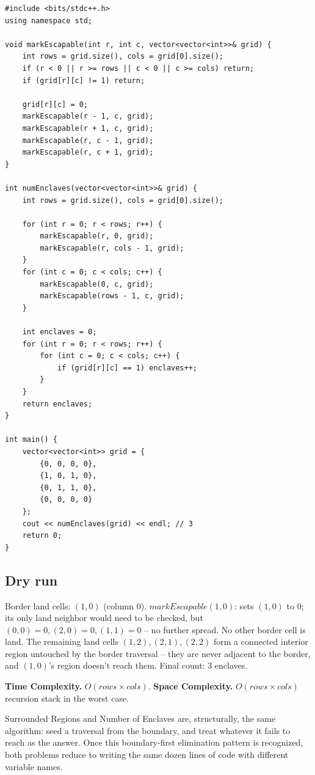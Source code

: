 \begin{lstlisting}
#include <bits/stdc++.h>
using namespace std;

void markEscapable(int r, int c, vector<vector<int>>& grid) {
    int rows = grid.size(), cols = grid[0].size();
    if (r < 0 || r >= rows || c < 0 || c >= cols) return;
    if (grid[r][c] != 1) return;

    grid[r][c] = 0;
    markEscapable(r - 1, c, grid);
    markEscapable(r + 1, c, grid);
    markEscapable(r, c - 1, grid);
    markEscapable(r, c + 1, grid);
}

int numEnclaves(vector<vector<int>>& grid) {
    int rows = grid.size(), cols = grid[0].size();

    for (int r = 0; r < rows; r++) {
        markEscapable(r, 0, grid);
        markEscapable(r, cols - 1, grid);
    }
    for (int c = 0; c < cols; c++) {
        markEscapable(0, c, grid);
        markEscapable(rows - 1, c, grid);
    }

    int enclaves = 0;
    for (int r = 0; r < rows; r++) {
        for (int c = 0; c < cols; c++) {
            if (grid[r][c] == 1) enclaves++;
        }
    }
    return enclaves;
}

int main() {
    vector<vector<int>> grid = {
        {0, 0, 0, 0},
        {1, 0, 1, 0},
        {0, 1, 1, 0},
        {0, 0, 0, 0}
    };
    cout << numEnclaves(grid) << endl; // 3
    return 0;
}
\end{lstlisting}

\subsection*{Dry run}


Border land cells: $(1,0)$ (column $0$). $\textit{markEscapable}(1,0)$:
sets $(1,0)$ to $0$; its only land neighbor would need to be checked,
but $(0,0)=0,(2,0)=0,(1,1)=0$ -- no further spread. No other border
cell is land. The remaining land cells $(1,2),(2,1),(2,2)$ form a
connected interior region untouched by the border traversal -- they
are never adjacent to the border, and $(1,0)$'s region doesn't reach
them. Final count: $3$ enclaves.

\begin{complexitybox}
\textbf{Time Complexity.} $O(\textit{rows} \times \textit{cols})$.
\textbf{Space Complexity.} $O(\textit{rows} \times \textit{cols})$
recursion stack in the worst case.
\end{complexitybox}

\begin{takeawaybox}
Surrounded Regions and Number of Enclaves are, structurally, the same
algorithm: seed a traversal from the boundary, and treat whatever it
fails to reach as the answer. Once this boundary-first elimination
pattern is recognized, both problems reduce to writing the same dozen
lines of code with different variable names.
\end{takeawaybox}
